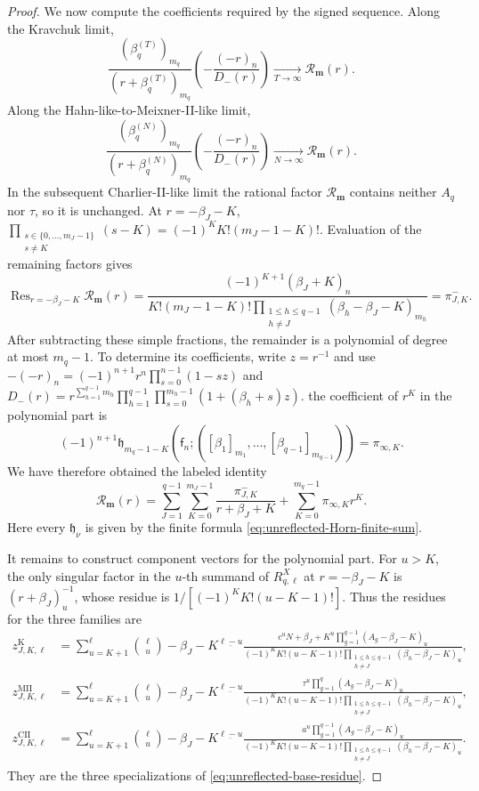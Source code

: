 \documentclass[10pt,a4paper]{amsart}
\DeclareMathOperator*{\Res}{Res}
\newcommand{\fall}[2]{#1^{\underline{#2}}}
\newcommand{\mm}{\boldsymbol m}
\begin{document}
\begin{proof}
We now compute the coefficients required by the signed sequence. Along the
Kravchuk limit,
\[
 \frac{(\beta_q^{(T)})_{m_q}}{(r+\beta_q^{(T)})_{m_q}}
 \left(-\frac{(-r)_n}{D_-(r)}\right)
 \xrightarrow[T\to\infty]{}\mathcal R_{\mm}(r).
\]
Along the Hahn-like-to-Meixner-II-like limit,
\[
 \frac{(\beta_q^{(N)})_{m_q}}{(r+\beta_q^{(N)})_{m_q}}
 \left(-\frac{(-r)_n}{D_-(r)}\right)
 \xrightarrow[N\to\infty]{}\mathcal R_{\mm}(r).
\]
In the subsequent Charlier-II-like limit the
rational factor \(\mathcal R_{\mm}\) contains neither \(A_q\) nor \(\tau\), so
it is unchanged. At \(r=-\beta_J-K\),
\(\prod_{\substack{s\in\{0,\ldots,m_J-1\}\\s\ne K}}(s-K)
=(-1)^K K!(m_J-1-K)!\).
Evaluation of the remaining factors gives
\[
 \Res_{r=-\beta_J-K}\mathcal R_{\mm}(r)
 =\frac{(-1)^{K+1}(\beta_J+K)_n}
 {K!(m_J-1-K)!
  \prod_{\substack{1\le h\le q-1\\h\ne J}}
  (\beta_h-\beta_J-K)_{m_h}}
 =\pi_{J,K}^{-}.
\]
After subtracting these simple fractions, the remainder is a polynomial
of degree at most \(m_q-1\). To determine its coefficients, write
\(z=r^{-1}\) and use
\(-(-r)_n=(-1)^{n+1}r^n\prod_{s=0}^{n-1}(1-sz)\) and
\(D_-(r)=r^{\sum_{h=1}^{q-1}m_h}
\prod_{h=1}^{q-1}\prod_{s=0}^{m_h-1}(1+(\beta_h+s)z)\).
the coefficient of \(r^K\) in the polynomial part is
\[
 (-1)^{n+1}
 \mathfrak h_{m_q-1-K}
 \left(\mathsf f_n;
 ([\beta_1]_{m_1},\ldots,[\beta_{q-1}]_{m_{q-1}})\right)
 =\pi_{\infty,K}.
\]
We have therefore obtained the labeled identity
\begin{equation}
 \mathcal R_{\mm}(r)=
 \sum_{J=1}^{q-1}\sum_{K=0}^{m_J-1}
 \frac{\pi_{J,K}^{-}}{r+\beta_J+K}
 +\sum_{K=0}^{m_q-1}\pi_{\infty,K}r^K.
 \label{eq:unreflected-target-partial-fractions}
\end{equation}
Here every \(\mathfrak h_\nu\) is given by the finite formula
\eqref{eq:unreflected-Horn-finite-sum}.

It remains to construct component vectors for the polynomial part.  For
\(u>K\), the only singular factor in the \(u\)-th summand of
\(R_{q,\ell}^X\) at \(r=-\beta_J-K\) is \((r+\beta_J)_u^{-1}\), whose
residue is \(1/[(-1)^K K!(u-K-1)!]\).
Thus the residues for the three families are
\begin{align*}
 z_{J,K,\ell}^{\mathrm K}
 &=\sum_{u=K+1}^{\ell}\binom\ell u
 \fall{-\beta_J-K}{\ell-u}
 \frac{c^u\fall{N+\beta_J+K}{u}
       \prod_{g=1}^{q-1}(A_g-\beta_J-K)_u}
 {(-1)^K K!(u-K-1)!
  \prod_{\substack{1\le h\le q-1\\h\ne J}}
  (\beta_h-\beta_J-K)_u},\\
 z_{J,K,\ell}^{\mathrm{MII}}
 &=\sum_{u=K+1}^{\ell}\binom\ell u
 \fall{-\beta_J-K}{\ell-u}
 \frac{\tau^u\prod_{g=1}^{q}(A_g-\beta_J-K)_u}
 {(-1)^K K!(u-K-1)!
  \prod_{\substack{1\le h\le q-1\\h\ne J}}
  (\beta_h-\beta_J-K)_u},\\
 z_{J,K,\ell}^{\mathrm{CII}}
 &=\sum_{u=K+1}^{\ell}\binom\ell u
 \fall{-\beta_J-K}{\ell-u}
 \frac{a^u\prod_{g=1}^{q-1}(A_g-\beta_J-K)_u}
 {(-1)^K K!(u-K-1)!
  \prod_{\substack{1\le h\le q-1\\h\ne J}}
  (\beta_h-\beta_J-K)_u}.
\end{align*}
They are the three specializations of
\eqref{eq:unreflected-base-residue}.


\end{proof}
\end{document}
